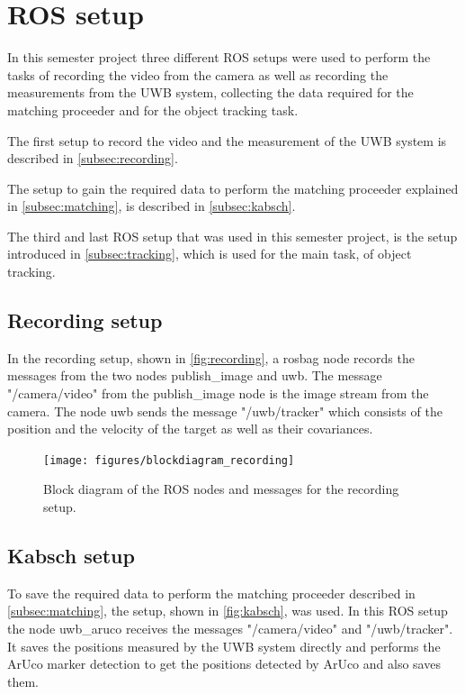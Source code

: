 \section{\ac{ROS} setup}
In this semester project three different \ac{ROS} setups were used to perform the tasks of recording the video from the camera as well as recording the measurements from the \ac{UWB} system, collecting the data required for the matching proceeder and for the object tracking task.

The first setup to record the video and the measurement of the \ac{UWB} system is described in \autoref{subsec:recording}.

The setup to gain the required data to perform the matching proceeder explained in \autoref{subsec:matching}, is described in \autoref{subsec:kabsch}.

The third and last \ac{ROS} setup that was used in this semester project, is the setup introduced in \autoref{subsec:tracking}, which is used for the main task, of object tracking.

\subsection{Recording setup}\label{subsec:recording}
In the recording setup, shown in \autoref{fig:recording}, a rosbag node records the messages from the two nodes publish\_image and uwb. The message "/camera/video" from the publish\_image node is the image stream from the camera. The node uwb sends the message "/uwb/tracker" which consists of the position and the velocity of the target as well as their covariances.

\begin{figure}[h]\centering
	\texttt{[image: figures/blockdiagram\_recording]}
	\caption{Block diagram of the \ac{ROS} nodes and messages for the recording setup.}\label{fig:recording}
\end{figure}

\subsection{Kabsch setup}\label{subsec:kabsch}
To save the required data to perform the matching proceeder described in \autoref{subsec:matching}, the setup, shown in \autoref{fig:kabsch}, was used. In this \ac{ROS} setup the node uwb\_aruco receives the messages "/camera/video" and "/uwb/tracker". It saves the positions measured by the \ac{UWB} system directly and performs the ArUco marker detection to get the positions detected by ArUco and also saves them.

